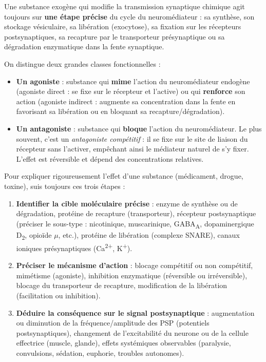 \documentclass[11pt]{article}
\newcommand{\cle}[1]{{\popxbold\color{popdark}#1}}
\begin{document}
\begin{definition}
Une substance exogène qui modifie la transmission synaptique chimique agit toujours sur \textbf{une étape précise} du cycle du neuromédiateur : sa synthèse, son stockage vésiculaire, sa libération (exocytose), sa fixation sur les récepteurs postsynaptiques, sa recapture par le transporteur présynaptique ou sa dégradation enzymatique dans la fente synaptique.

On distingue deux grandes classes fonctionnelles :
\begin{itemize}
    \item \textbf{Un \cle{agoniste}} : substance qui \textbf{mime} l'action du neuromédiateur endogène (agoniste direct : se fixe sur le récepteur et l'active) ou qui \textbf{renforce} son action (agoniste indirect : augmente sa concentration dans la fente en favorisant sa libération ou en bloquant sa recapture/dégradation).
    \item \textbf{Un \cle{antagoniste}} : substance qui \textbf{bloque} l'action du neuromédiateur. Le plus souvent, c'est un \emph{antagoniste compétitif} : il se fixe sur le site de liaison du récepteur sans l'activer, empêchant ainsi le médiateur naturel de s'y fixer. L'effet est réversible et dépend des concentrations relatives.
\end{itemize}
\end{definition}

\begin{methode}
Pour expliquer rigoureusement l'effet d'une substance (médicament, drogue, toxine), suis toujours ces trois étapes :
\begin{enumerate}
    \item \textbf{Identifier la cible moléculaire précise} : enzyme de synthèse ou de dégradation, protéine de recapture (transporteur), récepteur postsynaptique (préciser le sous-type : nicotinique, muscarinique, GABA\textsubscript{A}, dopaminergique D\textsubscript{2}, opioïde $\mu$, etc.), protéine de libération (complexe SNARE), canaux ioniques présynaptiques (Ca\textsuperscript{2+}, K\textsuperscript{+}).
    \item \textbf{Préciser le mécanisme d'action} : blocage compétitif ou non compétitif, mimétisme (agoniste), inhibition enzymatique (réversible ou irréversible), blocage du transporteur de recapture, modification de la libération (facilitation ou inhibition).
    \item \textbf{Déduire la conséquence sur le signal postsynaptique} : augmentation ou diminution de la fréquence/amplitude des PSP (potentiels postsynaptiques), changement de l'excitabilité du neurone ou de la cellule effectrice (muscle, glande), effets systémiques observables (paralysie, convulsions, sédation, euphorie, troubles autonomes).
\end{enumerate}
\end{methode}
\end{document}
